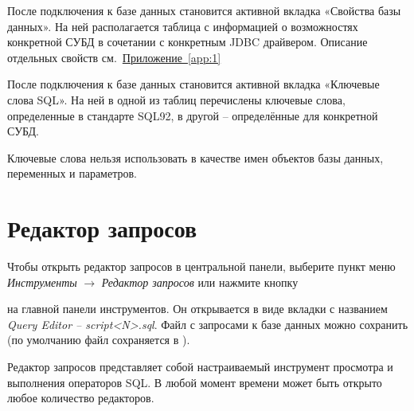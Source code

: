 
После подключения к базе данных становится активной вкладка «Свойства базы данных». На ней располагается таблица с информацией о возможностях конкретной СУБД в сочетании с конкретным JDBC драйвером. Описание отдельных свойств см.~\hyperref[app:1]{Приложение~\ref{app:1}}


После подключения к базе данных становится активной вкладка «Ключевые слова SQL». На ней в одной из таблиц перечислены ключевые слова, определенные в стандарте SQL92, в другой -- определённые для конкретной СУБД.

Ключевые слова нельзя использовать в качестве имен объектов базы данных, переменных и параметров. 

\newpage

\section{Редактор запросов}\label{sec:query_editor}

Чтобы открыть редактор запросов в центральной панели, выберите пункт меню \textit{Инструменты} $\rightarrow$ \textit{Редактор запросов} или нажмите кнопку  
на главной панели инструментов. Он открывается в виде вкладки с названием \textit{Query Editor -- script<N>.sql}. Файл с запросами к базе данных  можно сохранить (по умолчанию файл сохраняется в ). 

Редактор запросов представляет собой настраиваемый инструмент просмотра и выполнения операторов SQL. В любой момент времени может быть открыто любое количество редакторов.

